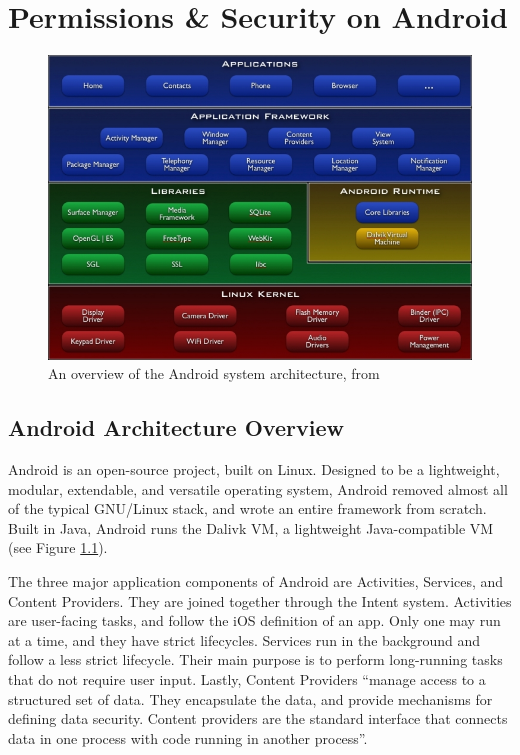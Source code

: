 \chapter{Permissions \& Security on Android}
\label{sec:permissions}

\begin{figure}[t]
\begin{center}
\includegraphics[width=0.7\columnwidth]{figs/system-architecture}
\caption{An overview of the Android system architecture, from \citep{androidarchitectureoverview}}
\label{fig:androidoverview}
\end{center}
\end{figure}


\section{Android Architecture Overview}
Android is an open-source project, built on Linux. Designed to be a lightweight, modular, extendable, and versatile operating system, Android removed almost all of the typical GNU/Linux stack, and wrote an entire framework from scratch. Built in Java, Android runs the Dalivk VM, a lightweight Java-compatible VM (see Figure \ref{fig:androidoverview}). 

The three major application components of Android are Activities, Services, and Content Providers. They are joined together through the Intent system. Activities are user-facing tasks, and follow the iOS definition of an app. Only one may run at a time, and they have strict lifecycles. Services run in the background and follow a less strict lifecycle. Their main purpose is to perform long-running tasks that do not require user input. Lastly, Content Providers ``manage access to a structured set of data. They encapsulate the data, and provide mechanisms for defining data security. Content providers are the standard interface that connects data in one process with code running in another process''\citep{androidcontentproviders}.

